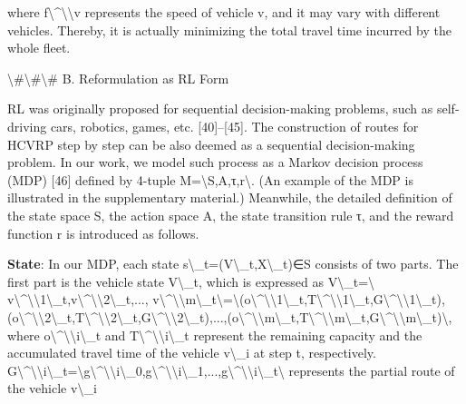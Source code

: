 \documentclass{article}
\begin{document}
	where f\textbackslash{}^\textbackslash{}{\textbackslash{}}v represents the speed of vehicle v, and it may vary with different vehicles. Thereby, it is actually minimizing the total travel time incurred by the whole fleet.
	
	\textbackslash{}#\textbackslash{}#\textbackslash{}# B. Reformulation as RL Form
	
	RL was originally proposed for sequential decision-making problems, such as self-driving cars, robotics, games, etc. [40]–[45]. The construction of routes for HCVRP step by step can be also deemed as a sequential decision-making problem. In our work, we model such process as a Markov decision process (MDP) [46] defined by 4-tuple M=\textbackslash{}{S,A,τ,r\textbackslash{}}. (An example of the MDP is illustrated in the supplementary material.) Meanwhile, the detailed definition of the state space S, the action space A, the state transition rule τ, and the reward function r is introduced as follows.
	
	\textbf{State}: In our MDP, each state s\textbackslash{}_t=(V\textbackslash{}_t,X\textbackslash{}_t)∈S consists of two parts. The first part is the vehicle state V\textbackslash{}_t, which is expressed as V\textbackslash{}_t=\textbackslash{}{ v\textbackslash{}^\textbackslash{}{\textbackslash{}}1\textbackslash{}_t,v\textbackslash{}^\textbackslash{}{\textbackslash{}}2\textbackslash{}_t,..., v\textbackslash{}^\textbackslash{}{\textbackslash{}}m\textbackslash{}_t\textbackslash{}}=\textbackslash{}{(o\textbackslash{}^\textbackslash{}{\textbackslash{}}1\textbackslash{}_t,T\textbackslash{}^\textbackslash{}{\textbackslash{}}1\textbackslash{}_t,G\textbackslash{}^\textbackslash{}{\textbackslash{}}1\textbackslash{}_t),(o\textbackslash{}^\textbackslash{}{\textbackslash{}}2\textbackslash{}_t,T\textbackslash{}^\textbackslash{}{\textbackslash{}}2\textbackslash{}_t,G\textbackslash{}^\textbackslash{}{\textbackslash{}}2\textbackslash{}_t),...,(o\textbackslash{}^\textbackslash{}{\textbackslash{}}m\textbackslash{}_t,T\textbackslash{}^\textbackslash{}{\textbackslash{}}m\textbackslash{}_t,G\textbackslash{}^\textbackslash{}{\textbackslash{}}m\textbackslash{}_t)\textbackslash{}}, where o\textbackslash{}^\textbackslash{}{\textbackslash{}}i\textbackslash{}_t and T\textbackslash{}^\textbackslash{}{\textbackslash{}}i\textbackslash{}_t represent the remaining capacity and the accumulated travel time of the vehicle v\textbackslash{}_i at step t, respectively. G\textbackslash{}^\textbackslash{}{\textbackslash{}}i\textbackslash{}_t=\textbackslash{}{g\textbackslash{}^\textbackslash{}{\textbackslash{}}i\textbackslash{}_0,g\textbackslash{}^\textbackslash{}{\textbackslash{}}i\textbackslash{}_1,...,g\textbackslash{}^\textbackslash{}{\textbackslash{}}i\textbackslash{}_t\textbackslash{}} represents the partial route of the vehicle v\textbackslash{}_i
	
\end{document}
